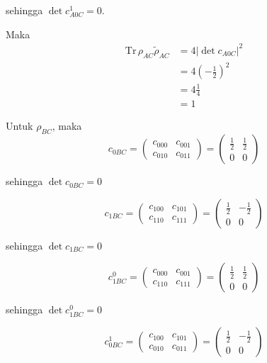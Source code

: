 sehingga $\det c_{A0C}^1 = 0$.

Maka
\begin{equation}
	\begin{aligned}
		\mathrm{Tr}\,\rho_{AC}\tilde{\rho}_{AC}
		&=4|\det c_{A0C}|^2\\
		&=4(-\frac{1}{2})^2\\
		&=4\frac{1}{4}\\
		&=1
	\end{aligned}
\end{equation}

Untuk $\rho_{BC}$, maka
\begin{equation}
	c_{0BC}=
	\begin{pmatrix}
		c_{000} & c_{001} \\
		c_{010} & c_{011}
	\end{pmatrix}=
	\begin{pmatrix}
		\frac{1}{2} & \frac{1}{2} \\
		0 & 0
	\end{pmatrix}
\end{equation}

sehingga $\det c_{0BC} = 0$

\begin{equation}
	c_{1BC}=
	\begin{pmatrix}
		c_{100} & c_{101} \\
		c_{110} & c_{111}
	\end{pmatrix}=
	\begin{pmatrix}
		\frac{1}{2} & -\frac{1}{2} \\
		0 & 0
	\end{pmatrix}
\end{equation}

sehingga $\det c_{1BC} = 0$

\begin{equation}
	c_{1BC}^0=
	\begin{pmatrix}
		c_{000} & c_{001} \\
		c_{110} & c_{111}
	\end{pmatrix}=
	\begin{pmatrix}
		\frac{1}{2} & \frac{1}{2} \\
		0 & 0
	\end{pmatrix}
\end{equation}

sehingga $\det c_{1BC}^0 = 0$

\begin{equation}
	c_{0BC}^1=
	\begin{pmatrix}
		c_{100} & c_{101} \\
		c_{010} & c_{011}
	\end{pmatrix}=
	\begin{pmatrix}
		\frac{1}{2} & -\frac{1}{2} \\
		0 & 0
	\end{pmatrix}
\end{equation}

